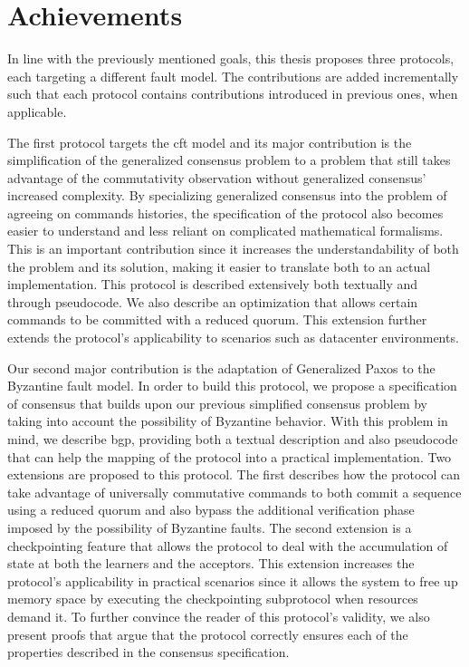 \section{Achievements}
In line with the previously mentioned goals, this thesis proposes three protocols, each targeting a different fault model. The contributions are added incrementally such that each protocol contains contributions introduced in previous ones, when applicable. \par
The first protocol targets the \acrshort{cft} model and its major contribution is the simplification of the generalized consensus problem to a problem that still takes advantage of the commutativity observation without generalized consensus' increased complexity. By specializing generalized consensus into the problem of agreeing on commands histories, the specification of the protocol also becomes easier to understand and less reliant on complicated mathematical formalisms. This is an important contribution since it increases the understandability of both the problem and its solution, making it easier to translate both to an actual implementation. This protocol is described extensively both textually and through pseudocode. We also describe an optimization that allows certain commands to be committed with a reduced quorum. This extension further extends the protocol's applicability to scenarios such as datacenter environments.\par
Our second major contribution is the adaptation of Generalized Paxos to the Byzantine fault model. In order to build this protocol, we propose a specification of consensus that builds upon our previous simplified consensus problem by taking into account the possibility of Byzantine behavior. With this problem in mind, we describe \acrlong{bgp}, providing both a textual description and also pseudocode that can help the mapping of the protocol into a practical implementation. Two extensions are proposed to this protocol. The first describes how the protocol can take advantage of universally commutative commands to both commit a sequence using a reduced quorum and also bypass the additional verification phase imposed by the possibility of Byzantine faults. The second extension is a checkpointing feature that allows the protocol to deal with the accumulation of state at both the learners and the acceptors. This extension increases the protocol's applicability in practical scenarios since it allows the system to free up memory space by executing the checkpointing subprotocol when resources demand it. To further convince the reader of this protocol's validity, we also present proofs that argue that the protocol correctly ensures each of the properties described in the consensus specification.\par
